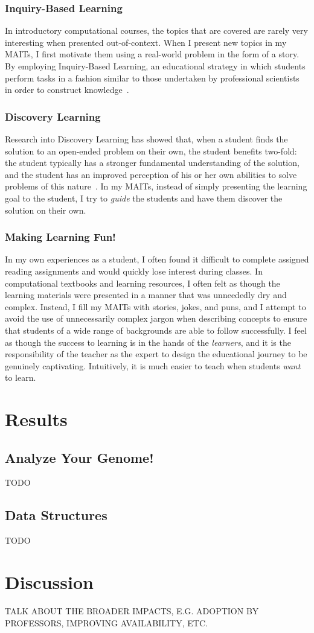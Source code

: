 \subsubsection{Inquiry-Based Learning}
In introductory computational courses, the topics that are covered are rarely very interesting when presented out-of-context. When I present new topics in my \glspl{MAIT}, I first motivate them using a real-world problem in the form of a story. By employing Inquiry-Based Learning, an educational strategy in which students perform tasks in a fashion similar to those undertaken by professional scientists in order to construct knowledge~\cite{Pedaste2015}.

\subsubsection{Discovery Learning}
Research into Discovery Learning has showed that, when a student finds the solution to an open-ended problem on their own, the student benefits two-fold: the student typically has a stronger fundamental understanding of the solution, and the student has an improved perception of his or her own abilities to solve problems of this nature~\cite{Bruner1961}. In my \glspl{MAIT}, instead of simply presenting the learning goal to the student, I try to \textit{guide} the students and have them discover the solution on their own.

\subsubsection{Making Learning Fun!}
In my own experiences as a student, I often found it difficult to complete assigned reading assignments and would quickly lose interest during classes. In computational textbooks and learning resources, I often felt as though the learning materials were presented in a manner that was unneededly dry and complex. Instead, I fill my \glspl{MAIT} with stories, jokes, and puns, and I attempt to avoid the use of unnecessarily complex jargon when describing concepts to ensure that students of a wide range of backgrounds are able to follow successfully. I feel as though the success to learning is in the hands of the \textit{learners}, and it is the responsibility of the teacher as the expert to design the educational journey to be genuinely captivating. Intuitively, it is much easier to teach when students \textit{want} to learn.

\section{Results}
\subsection{Analyze Your Genome!}
TODO

\subsection{Data Structures}
TODO

\section{Discussion}
TALK ABOUT THE BROADER IMPACTS, E.G. ADOPTION BY PROFESSORS, IMPROVING AVAILABILITY, ETC.

